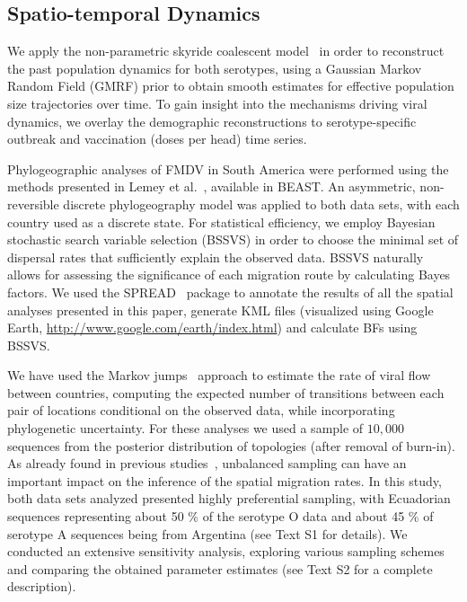 \documentclass[10pt]{article}
\begin{document}
\subsection*{Spatio-temporal Dynamics}

We apply the non-parametric skyride coalescent model~\cite{skyride} in order to reconstruct the past population dynamics for both serotypes, using a Gaussian Markov Random Field (GMRF) prior to obtain smooth estimates for effective population size trajectories over time.
To gain insight into the mechanisms driving viral dynamics, we overlay the demographic reconstructions to serotype-specific outbreak and vaccination (doses per head) time series.

Phylogeographic analyses of FMDV in South America were performed using the methods presented in Lemey et al.~\cite{roots}, available in BEAST. 
An asymmetric, non-reversible discrete phylogeography model was applied to both data sets, with each country used as a discrete state.
For statistical efficiency, we employ Bayesian stochastic search variable selection (BSSVS) in order to choose the minimal set of dispersal rates that sufficiently explain the observed data.
BSSVS naturally allows for assessing the significance of each migration route by calculating Bayes factors.
We used the SPREAD~\cite{spread} package to annotate the results of all the spatial analyses presented in this paper, generate KML files (visualized using Google Earth, \url{http://www.google.com/earth/index.html}) and calculate BFs using BSSVS.

We have used the Markov jumps~\cite{Minin2008} approach to estimate the rate of viral flow between countries, computing the expected number of transitions between each pair of locations conditional on the observed data, while incorporating phylogenetic uncertainty.
For these analyses we used a sample of $10,000$ sequences from the posterior distribution of topologies (after removal of burn-in). 
As already found in previous studies~\cite{Faria2012, Lemey2014}, unbalanced sampling can have an important impact on the inference of the spatial migration rates.
In this study, both data sets analyzed presented highly preferential sampling, with Ecuadorian sequences representing about 50 \% of the serotype O data and about 45 \% of serotype A sequences being from Argentina (see Text S1 for details).
We conducted an extensive sensitivity analysis, exploring various sampling schemes and comparing the obtained parameter estimates (see Text S2 for a complete description).
\end{document}
